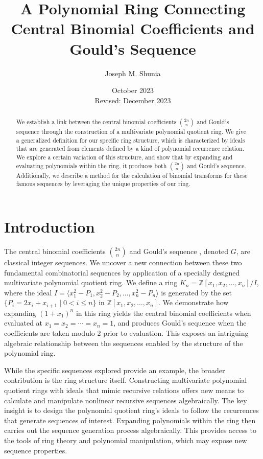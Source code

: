 \documentclass{article}
\theoremstyle{plain}
\theoremstyle{definition}
\newcommand{\Z}{\mathbb{Z}}
\newcommand{\K}{K}
\begin{document}
\title{A Polynomial Ring Connecting Central Binomial Coefficients and Gould's Sequence}
\author{Joseph M. Shunia}
\date{October 2023 \\ \small Revised: December 2023 \normalsize}
\maketitle

\begin{abstract}
We establish a link between the central binomial coefficients $\binom{2n}{n}$ and Gould's sequence through the construction of a multivariate polynomial quotient ring. We give a generalized definition for our specific ring structure, which is characterized by ideals that are generated from elements defined by a kind of polynomial recurrence relation. We explore a certain variation of this structure, and show that by expanding and evaluating  polynomials within the ring, it produces both $\binom{2n}{n}$ and Gould's sequence. Additionally, we describe a method for the calculation of binomial transforms for these famous sequences by leveraging the unique properties of our ring.
\end{abstract}

\section{Introduction}
The central binomial coefficients $\binom{2n}{n}$ \cite{A000984} and Gould's sequence \cite{A001316}, denoted $G$, are classical integer sequences. We uncover a new connection between these two fundamental combinatorial sequences by application of a specially designed multivariate polynomial quotient ring. We define a ring $\K_n = \Z[x_1, x_2, \ldots, x_n]/I$, where the ideal $I = \langle x_1^2 - P_1, x_2^2 - P_2, \ldots, x_n^2 - P_n \rangle$ is generated by the set $\{P_i = 2x_i + x_{i+1} \mid 0 < i \leq n \}$ in $\Z[x_1, x_2, \ldots, x_n]$. We demonstrate how expanding $(1 + x_1)^n$ in this ring yields the central binomial coefficients when evaluated at $x_1=x_2=\cdots=x_n=1$, and produces Gould's sequence when the coefficients are taken modulo $2$ prior to evaluation. This exposes an intriguing algebraic relationship between the sequences enabled by the structure of the polynomial ring.

While the specific sequences explored provide an example, the broader contribution is the ring structure itself. Constructing multivariate polynomial quotient rings with ideals that mimic recursive relations offers new means to calculate and manipulate nonlinear recursive sequences algebraically. The key insight is to design the polynomial quotient ring's ideals to follow the recurrences that generate sequences of interest. Expanding polynomials within the ring then carries out the sequence generation process algebraically. This provides access to the tools of ring theory and polynomial manipulation, which may expose new sequence properties.
\end{document}
